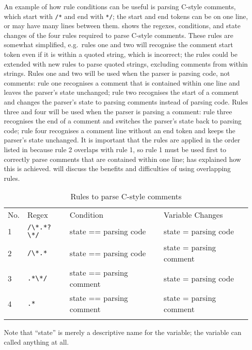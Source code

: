 An example of how rule conditions can be useful is parsing C-style
comments, which start with \texttt{/*} and end with \texttt{*/}; the start
and end tokens can be on one line, or may have many lines between them.
 shows the regexes, conditions,
and state changes of the four rules required to parse C-style comments.
These rules are somewhat simplified, e.g.\ rules one and two will recognise
the comment start token even if it is within a quoted string, which is
incorrect; the rules could be extended with new rules to parse quoted
strings, excluding comments from within strings.  Rules one and two will be
used when the parser is parsing code, not comments: rule one recognises a
comment that is contained within one line and leaves the parser's state
unchanged; rule two recognises the start of a comment and changes the
parser's state to parsing comments instead of parsing code.  Rules three
and four will be used when the parser is parsing a comment: rule three
recognises the end of a comment and switches the parser's state back to
parsing code; rule four recognises a comment line without an end token and
keeps the parser's state unchanged.  It is important that the rules are
applied in the order listed in 
because rule 2 overlaps with rule 1, so rule 1 must be used first to
correctly parse comments that are contained within one line;
 has explained how this is achieved.
 will discuss the benefits
and difficulties of using overlapping rules.

\begin{table}[thbp]
    \caption{Rules to parse C-style comments}
    \empty{}\label{Rules to parse C-style comments}
    \begin{tabular}{llll}
        \tabletopline{}%
        No.   & Regex             & Condition                 & Variable Changes          \\
        \tablemiddleline{}%
        1     & \verb!/\*.*?\*/!  & state == parsing code     & state = parsing code      \\
        2     & \verb!/\*.*!      & state == parsing code     & state = parsing comment   \\
        3     & \verb!.*\*/!      & state == parsing comment  & state = parsing code      \\
        4     & \verb!.*!         & state == parsing comment  & state = parsing comment   \\
        \tablebottomline{}%
    \end{tabular}

    Note that ``state'' is merely a descriptive name for the variable; the
    variable can called anything at all.

\end{table}

